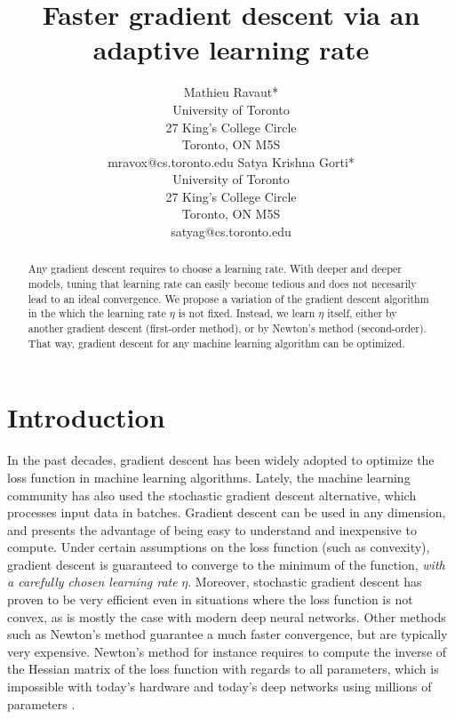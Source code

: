 \documentclass{article}
\title{Faster gradient descent via an adaptive learning rate}
\author{
	Mathieu Ravaut* \\ 
	University of Toronto \\
	27 King's College Circle\\
	Toronto, ON M5S\\
	mravox@cs.toronto.edu 
	\And
  	Satya Krishna Gorti*\\
	University of Toronto\\
	27 King's College Circle\\
	Toronto, ON M5S\\
	satyag@cs.toronto.edu	
}
\begin{document}
  
  
  \maketitle
  
  \begin{abstract}
    Any gradient descent requires to choose a learning rate. With deeper and deeper models, tuning that learning rate can easily become tedious and does not necesarily lead to an ideal convergence. We propose a variation of the gradient descent algorithm in the which the learning rate $\eta$ is not fixed. Instead, we learn $\eta$ itself, either by another gradient descent (first-order method), or by Newton's method (second-order). That way, gradient descent for any machine learning algorithm can be optimized. 
  \end{abstract}
  
  \thispagestyle{equalc}
  \section{Introduction}
  
  In the past decades, gradient descent has been widely adopted to optimize the loss function in machine learning algorithms. Lately, the machine learning community has also used the stochastic gradient descent alternative, which processes input data in batches. Gradient descent can be used in any dimension, and presents the advantage of being easy to understand and inexpensive to compute. Under certain assumptions on the loss function (such as convexity), gradient descent is guaranteed to converge to the minimum of the function, \emph{with a carefully chosen learning rate} $\eta$. Moreover, stochastic gradient descent has proven to be very efficient even in situations where the loss function is not convex, as is mostly the case with modern deep neural networks. Other methods such as Newton's method guarantee a much faster convergence, but are typically very expensive. Newton's method for instance requires to compute the inverse of the Hessian matrix of the loss function with regards to all parameters, which is impossible with today's hardware and today's deep networks using millions of parameters \cite{krizhevsky2012imagenet}. \\
  
\end{document}
